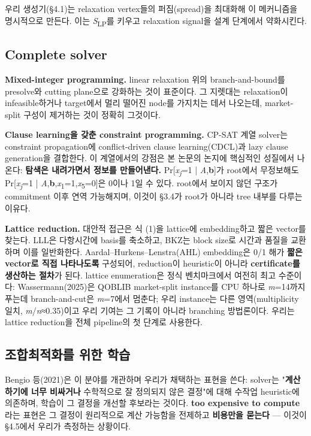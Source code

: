 \documentclass[final,5p,twocolumn]{elsarticle}
\begin{document}
우리 생성기(§4.1)는 relaxation vertex들의 퍼짐(spread)을 최대화해 이 메커니즘을 명시적으로 만든다. 이는 \textit{S}\textsubscript{LP}를 키우고 relaxation signal을 설계 단계에서 약화시킨다.

\subsection{Complete solver}
\textbf{Mixed-integer programming.} linear relaxation 위의 branch-and-bound를 presolve와 cutting plane으로 강화하는 것이 표준이다. 그 지렛대는 relaxation이 infeasible하거나 target에서 멀리 떨어진 node를 가지치는 데서 나오는데, market-split 구성이 제거하는 것이 정확히 그것이다.

\textbf{Clause learning을 갖춘 constraint programming.} CP-SAT 계열 solver는 constraint propagation에 conflict-driven clause learning(CDCL)과 lazy clause generation을 결합한다. 이 계열에서의 강점은 본 논문의 논지에 핵심적인 성질에서 나온다: \textbf{탐색은 내려가면서 정보를 만들어낸다.} Pr[\textit{x\textsubscript{j}}=1 | \textit{A},\textbf{b}]가 root에서 무정보해도 Pr[\textit{x\textsubscript{j}}=1 | \textit{A},\textbf{b},\textit{x}\textsubscript{1}=1,\textit{x}\textsubscript{5}=0]은 0이나 1일 수 있다. root에서 보이지 않던 구조가 commitment 이후 연역 가능해지며, 이것이 §3.4가 root가 아니라 tree 내부를 다루는 이유다.

\textbf{Lattice reduction.} 대안적 접근은 식 (1)을 lattice에 embedding하고 짧은 vector를 찾는다. LLL은 다항시간에 basis를 축소하고, BKZ는 block size로 시간과 품질을 교환하며 이를 일반화한다. Aardal–Hurkens–Lenstra(AHL) embedding은 0/1 해가 \textbf{짧은 vector로 직접 나타나도록} 구성되어, reduction이 heuristic이 아니라 \textbf{certificate를 생산하는 절차}가 된다. lattice enumeration은 정식 벤치마크에서 여전히 최고 수준이다: Wassermann(2025)은 QOBLIB market-split instance를 CPU 하나로 \textit{m}=14까지 푸는데 branch-and-cut은 \textit{m}=7에서 멈춘다; 우리 instance는 다른 영역(multiplicity 일치, \textit{m}/\textit{n}≈0.35)이고 우리 기여는 그 기록이 아니라 branching 방법론이다. 우리는 lattice reduction을 전체 pipeline의 첫 단계로 사용한다.

\subsection{조합최적화를 위한 학습}
Bengio 등(2021)은 이 분야를 개관하며 우리가 채택하는 표현을 쓴다: solver는 "\textbf{계산하기에 너무 비싸거나} 수학적으로 잘 정의되지 않은 결정"에 대해 수작업 heuristic에 의존하며, 학습이 그 결정을 개선할 후보라는 것이다. \textbf{too expensive to compute}라는 표현은 그 결정이 원리적으로 계산 가능함을 전제하고 \textbf{비용만을 묻는다} — 이것이 §4.5에서 우리가 측정하는 상황이다.
\end{document}

